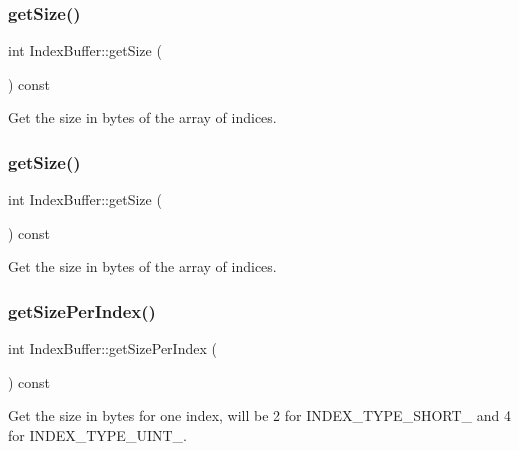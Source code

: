 \subsubsection{\texorpdfstring{get\+Size()}{getSize()}\hspace{0.1cm}{\footnotesize\ttfamily [1/2]}}
{\footnotesize\ttfamily int Index\+Buffer\+::get\+Size (\begin{DoxyParamCaption}{ }\end{DoxyParamCaption}) const}

Get the size in bytes of the array of indices. \mbox{\label{classIndexBuffer_a3c585378aeead477542951d977fbf9d5}} 
\subsubsection{\texorpdfstring{get\+Size()}{getSize()}\hspace{0.1cm}{\footnotesize\ttfamily [2/2]}}
{\footnotesize\ttfamily int Index\+Buffer\+::get\+Size (\begin{DoxyParamCaption}{ }\end{DoxyParamCaption}) const}

Get the size in bytes of the array of indices. \mbox{\label{classIndexBuffer_a598dc0ed5aa4f8266a5ee04c6e8ffb94}} 
\subsubsection{\texorpdfstring{get\+Size\+Per\+Index()}{getSizePerIndex()}\hspace{0.1cm}{\footnotesize\ttfamily [1/2]}}
{\footnotesize\ttfamily int Index\+Buffer\+::get\+Size\+Per\+Index (\begin{DoxyParamCaption}{ }\end{DoxyParamCaption}) const}

Get the size in bytes for one index, will be 2 for I\+N\+D\+E\+X\+\_\+\+T\+Y\+P\+E\+\_\+\+S\+H\+O\+R\+T\+\_ and 4 for I\+N\+D\+E\+X\+\_\+\+T\+Y\+P\+E\+\_\+\+U\+I\+N\+T\+\_. \mbox{\label{classIndexBuffer_a598dc0ed5aa4f8266a5ee04c6e8ffb94}} 
